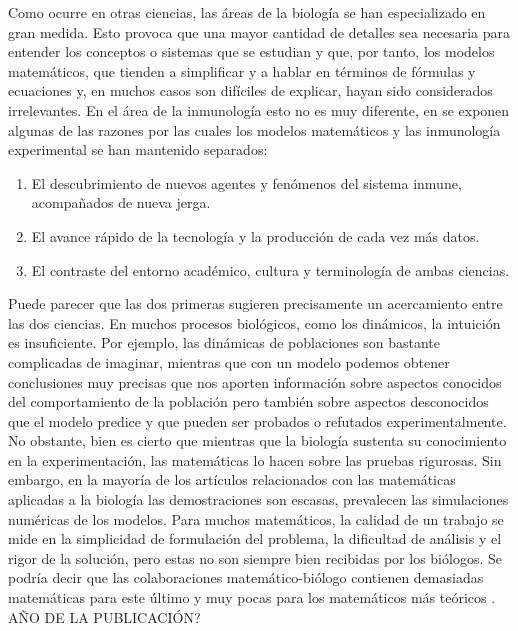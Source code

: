 Como ocurre en otras ciencias, las áreas de la biología se han especializado en gran medida. Esto provoca que una mayor cantidad de detalles sea necesaria para entender los conceptos o sistemas que se estudian y que, por tanto, los modelos matemáticos, que tienden a simplificar y a hablar en términos de fórmulas y ecuaciones y, en muchos casos son difíciles de explicar, hayan sido considerados irrelevantes. En el área de la inmunología esto no es muy diferente, en \cite{mathsModInmu} se exponen algunas de las razones por las cuales los modelos matemáticos y las inmunología experimental se han mantenido separados:

\begin{enumerate}
	\item El descubrimiento de nuevos agentes y fenómenos del sistema inmune, acompañados de nueva jerga.
	
	\item El avance rápido de la tecnología y la producción de cada vez más datos.
	
	\item El contraste del entorno académico, cultura y terminología de ambas ciencias.
\end{enumerate}

Puede parecer que las dos primeras sugieren precisamente un acercamiento entre las dos ciencias. En muchos procesos biológicos, como los dinámicos, la intuición es insuficiente. Por ejemplo, las dinámicas de poblaciones son bastante complicadas de imaginar, mientras que con un modelo podemos obtener conclusiones muy precisas que nos aporten información sobre aspectos conocidos del comportamiento de la población pero también sobre aspectos desconocidos que el modelo predice y que pueden ser probados o refutados experimentalmente. No obstante, bien es cierto que mientras que la biología sustenta su conocimiento en la experimentación, las matemáticas lo hacen sobre las pruebas rigurosas. Sin embargo, en la mayoría de los artículos relacionados con las matemáticas aplicadas a la biología las demostraciones son escasas, prevalecen las simulaciones numéricas de los modelos. Para muchos matemáticos, la calidad de un trabajo se mide en la simplicidad de formulación del problema, la dificultad de análisis y el rigor de la solución, pero estas no son siempre bien recibidas por los biólogos. Se podría decir que las colaboraciones matemático-biólogo contienen demasiadas matemáticas para este último y muy pocas para los matemáticos más teóricos \citep{RoleOfM}. AÑO DE LA PUBLICACIÓN?

